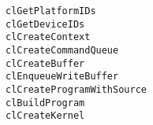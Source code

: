 \lstset{language=C++}
\begin{lstlisting}
clGetPlatformIDs
clGetDeviceIDs
clCreateContext
clCreateCommandQueue
clCreateBuffer
clEnqueueWriteBuffer
clCreateProgramWithSource
clBuildProgram
clCreateKernel
\end{lstlisting}